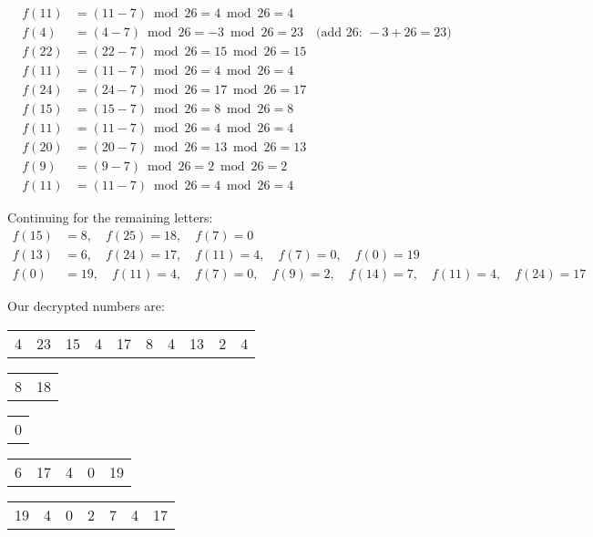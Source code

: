 \documentclass[12pt]{article}
\begin{document}
\begin{align*}
f(11) &= (11 - 7) \bmod 26 = 4 \bmod 26 = 4 \\
f(4) &= (4 - 7) \bmod 26 = -3 \bmod 26 = 23 \quad \text{(add 26: } -3 + 26 = 23\text{)} \\
f(22) &= (22 - 7) \bmod 26 = 15 \bmod 26 = 15 \\
f(11) &= (11 - 7) \bmod 26 = 4 \bmod 26 = 4 \\
f(24) &= (24 - 7) \bmod 26 = 17 \bmod 26 = 17 \\
f(15) &= (15 - 7) \bmod 26 = 8 \bmod 26 = 8 \\
f(11) &= (11 - 7) \bmod 26 = 4 \bmod 26 = 4 \\
f(20) &= (20 - 7) \bmod 26 = 13 \bmod 26 = 13 \\
f(9) &= (9 - 7) \bmod 26 = 2 \bmod 26 = 2 \\
f(11) &= (11 - 7) \bmod 26 = 4 \bmod 26 = 4
\end{align*}

Continuing for the remaining letters:
\begin{align*}
f(15) &= 8, \quad f(25) = 18, \quad f(7) = 0 \\
f(13) &= 6, \quad f(24) = 17, \quad f(11) = 4, \quad f(7) = 0, \quad f(0) = 19 \\
f(0) &= 19, \quad f(11) = 4, \quad f(7) = 0, \quad f(9) = 2, \quad f(14) = 7, \quad f(11) = 4, \quad f(24) = 17
\end{align*}

\vspace{0.2cm}
\noindent Our decrypted numbers are:
\begin{center}
\begin{tabular}{cccccccccc}
4 & 23 & 15 & 4 & 17 & 8 & 4 & 13 & 2 & 4 \\
\end{tabular}
\end{center}
\begin{center}
\begin{tabular}{cc}
8 & 18 \\
\end{tabular}
\qquad
\begin{tabular}{c}
0 \\
\end{tabular}
\qquad
\begin{tabular}{ccccc}
6 & 17 & 4 & 0 & 19 \\
\end{tabular}
\qquad
\begin{tabular}{ccccccc}
19 & 4 & 0 & 2 & 7 & 4 & 17
\end{tabular}
\end{center}
\end{document}
